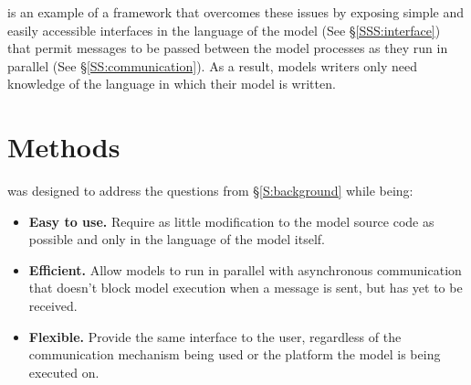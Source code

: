 \documentclass[journal]{IEEEtran}
\newcommand{\todo}[1]{{\color{red}{#1}}}
\newcommand{\pkg}{{\tt \todo{cis\_interface}}{}}
\begin{document}
{\pkg} is an example of a framework that overcomes these issues by exposing simple and easily accessible interfaces in the language of the model (See \S\ref{SSS:interface}) that permit messages to be passed between the model processes as they run in parallel (See \S\ref{SS:communication}). As a result, models writers only need knowledge of the language in which their model is written.

%

\section{Methods}\label{S:methods}

{\pkg} was designed to address the questions from \S\ref{S:background} while being:

\begin{itemize}
	\item {\bf Easy to use.} Require as little modification to the model source code as possible and only in the language of the model itself.
	\item {\bf Efficient.} Allow models to run in parallel with asynchronous communication that doesn't block model execution when a message is sent, but has yet to be received.
	\item {\bf Flexible.} Provide the same interface to the user, regardless of the communication mechanism being used or the platform the model is being executed on.
\end{itemize}
\end{document}
